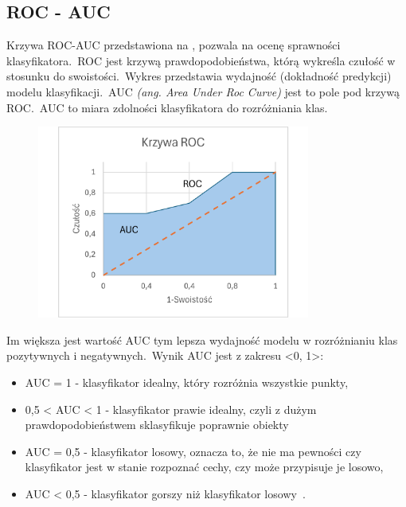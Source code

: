 \subsection{ROC - AUC}
Krzywa ROC-AUC przedstawiona na , pozwala na ocenę sprawności klasyfikatora.\ ROC jest krzywą prawdopodobieństwa, którą wykreśla czułość w stosunku do swoistości.\ Wykres przedstawia wydajność (dokładność predykcji) modelu klasyfikacji.\ AUC \textit{(ang. Area Under Roc Curve)} jest to pole pod krzywą ROC.\ AUC to miara zdolności klasyfikatora do rozróżniania klas.

\begin{figure}[H]
    \centering
    \includegraphics[width=0.8\textwidth]{images/roc-auc}
    \label{fig:roc-auc}
\end{figure}

Im większa jest wartość AUC tym lepsza wydajność modelu w rozróżnianiu klas pozytywnych i negatywnych.\ Wynik AUC jest z zakresu <0, 1>:
\begin{itemize}
    \item AUC = 1 - klasyfikator idealny, który rozróżnia wszystkie punkty,
    \item 0,5 < AUC < 1 - klasyfikator prawie idealny, czyli z dużym prawdopodobieństwem sklasyfikuje poprawnie obiekty
    \item AUC = 0,5 - klasyfikator losowy, oznacza to, że nie ma pewności czy klasyfikator jest w stanie rozpoznać cechy, czy może przypisuje je losowo,
    \item AUC < 0,5 - klasyfikator gorszy niż klasyfikator losowy~\cite{Algolytics, Agrawal2024}.
\end{itemize}